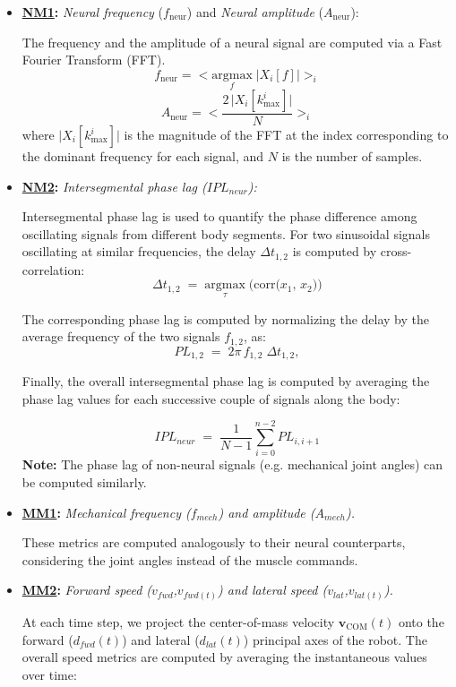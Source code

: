 \documentclass{cmc}
\begin{document}
\begin{itemize}
  \item \textbf{\underline{NM1}: }\textit{Neural frequency} (\(f_{\mathrm{neur}}\)) and \textit{Neural amplitude} (\(A_{\mathrm{neur}}\)):

  The frequency and the amplitude of a neural signal are computed via a Fast Fourier Transform (FFT).
  \[
    f_{\mathrm{neur}} = < \underset{f}{\mathrm{argmax}}\;\bigl|X_i[f]\bigr| >_i
  \]
  \[
    A_{\mathrm{neur}} = <\frac{2\,\bigl|X_i[k^i_{\text{max}}]\bigr|}{N} >_i
  \]
  where \(\bigl|X_i[k^i_{\text{max}}]\bigr|\) is the magnitude of the FFT at the index corresponding to the dominant frequency for each signal, and \(N\) is the number of samples.

  \item \textbf{\underline{NM2}: }\textit{Intersegmental phase lag ($IPL_{neur}$):}

  Intersegmental phase lag is used to quantify the phase difference among oscillating signals from different body segments. For two sinusoidal signals oscillating at similar frequencies, the delay \(\Delta t_{1,2}\) is computed by cross-correlation:
  \[
    \Delta t_{1,2}\;=\;\underset{\tau}{\mathrm{argmax}}\;\bigl(\mathrm{corr}\bigl(x_1,\,x_2\bigr)\bigr)
  \]

  The corresponding phase lag is computed by normalizing the delay by the average frequency of the two signals \(f_{1,2}\), as:
  \[
    PL_{1,2} \;=\; 2\pi\,f_{1,2}\;\Delta t_{1,2},
  \]

  Finally, the overall intersegmental phase lag is computed by averaging the phase lag values for each successive couple of signals along the body:

    \[
    IPL_{neur} \;=\; \frac{1}{N-1} \sum_{i=0}^{n-2} PL_{i, i+1}
    \]
\textbf{Note:} The phase lag of non-neural signals (e.g. mechanical joint angles) can be computed similarly.


    \item \textbf{\underline{MM1}: } \textit{Mechanical frequency ($f_{mech}$) and amplitude ($A_{mech}$).}

    These metrics are computed analogously to their neural counterparts, considering the joint angles instead of the muscle commands.

    \item \textbf{\underline{MM2}: }\textit{Forward speed ($v_{fwd}$,$v_{fwd(t)}$) and lateral speed ($v_{lat}$,$v_{lat(t)}$).}

    At each time step, we project the center-of-mass velocity \(\mathbf{v}_{\mathrm{COM}}(t)\) onto the forward ($d_{fwd}(t)$) and lateral ($d_{lat}(t)$) principal axes of the robot.
    The overall speed metrics are computed by averaging the instantaneous values over time:


\end{itemize}
\end{document}
